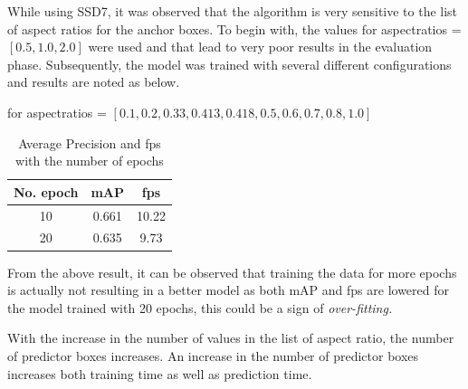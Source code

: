 \newpara
While using SSD7, it was observed that the algorithm is very sensitive to the list of aspect ratios for the anchor boxes. To begin with, the values for aspect\textunderscore ratios = $[0.5, 1.0, 2.0]$ were used and that lead to very poor results in the evaluation phase. Subsequently, the model was trained with several different configurations and results are noted as below.

for aspect\textunderscore ratios = $[0.1, 0.2, 0.33, 0.413, 0.418, 0.5, 0.6, 0.7, 0.8, 1.0]$
\begin{table}[H]
\begin{center}
 \begin{tabular}{||c c c||} 
 \hline
 No. epoch & mAP & fps\\ [0.8ex] 
 \hline\hline
 10 & 0.661 & 10.22\\ 
 \hline
 20  & 0.635 & 9.73 \\
\hline
\end{tabular}
\caption{Average Precision and fps with the number of epochs}
\end{center}
\end{table}
From the above result, it can be observed that training the data for more epochs is actually not resulting in a better model as both mAP and fps are lowered for the model trained with 20 epochs, this could be a sign of \textit{over-fitting.}




With the increase in the number of values in the list of aspect ratio, the number of predictor boxes increases. An increase in the number of predictor boxes increases both training time as well as prediction time.
